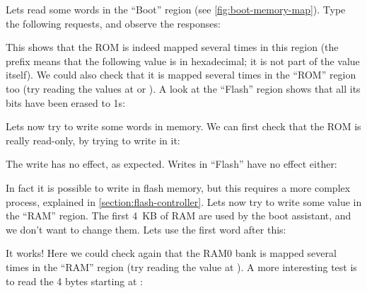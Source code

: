 
Lets read some words in the ``Boot'' region (see \cref{fig:boot-memory-map}).
Type the following requests, and observe the responses:


\noindent This shows that the ROM is indeed mapped several times in this region
(the  prefix means that the following value is in hexadecimal; it is
not part of the value itself). We could also check that it is mapped several
times in the ``ROM'' region too (try reading the values at  or
). A look at the ``Flash'' region shows that all its bits have
been erased to 1s:


Lets now try to write some words in memory. We can first check that the ROM is
really read-only, by trying to write in it:


\noindent The write has no effect, as expected. Writes in ``Flash'' have no
effect either:


\noindent In fact it is possible to write in flash memory, but this requires a
more complex process, explained in \cref{section:flash-controller}. Lets now
try to write some value in the ``RAM'' region. The first 4~KB of RAM are used
by the boot assistant, and we don't want to change them. Lets use the first
word after this:


\noindent It works! Here we could check again that the RAM0 bank is mapped
several times in the ``RAM'' region (try reading the value at ).
A more interesting test is to read the 4 bytes starting at :

